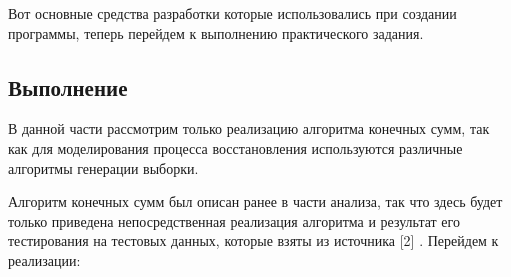 Вот основные средства разработки которые использовались при создании программы, теперь перейдем к выполнению практического задания.
\begin{center}
\item\section{Выполнение}
\end{center}
В данной части рассмотрим только реализацию алгоритма конечных сумм, так как для моделирования процесса восстановления используются различные алгоритмы генерации выборки.

Алгоритм конечных сумм был описан ранее в части анализа, так что здесь будет только приведена непосредственная реализация  алгоритма и результат его тестирования на тестовых данных, которые взяты из источника [2] . Перейдем к реализации:
